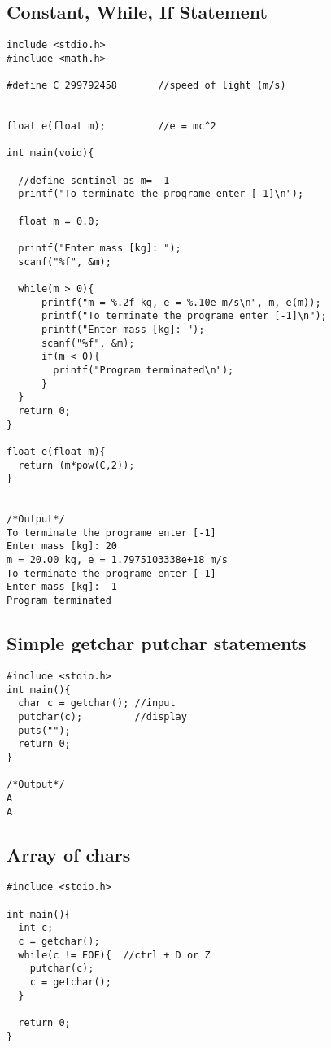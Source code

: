 \documentclass[10pt, a4paper, twocolumn]{article} %
\begin{document}
\newpage
\subsection{Constant, While, If Statement}

\begin{lstlisting}
include <stdio.h>
#include <math.h>

#define C 299792458       //speed of light (m/s)


float e(float m);         //e = mc^2

int main(void){

  //define sentinel as m= -1
  printf("To terminate the programe enter [-1]\n");

  float m = 0.0;

  printf("Enter mass [kg]: ");
  scanf("%f", &m);

  while(m > 0){
      printf("m = %.2f kg, e = %.10e m/s\n", m, e(m));
      printf("To terminate the programe enter [-1]\n");
      printf("Enter mass [kg]: ");
      scanf("%f", &m);
      if(m < 0){
        printf("Program terminated\n");
      }
  }
  return 0;
}

float e(float m){
  return (m*pow(C,2));
}


/*Output*/
To terminate the programe enter [-1]
Enter mass [kg]: 20
m = 20.00 kg, e = 1.7975103338e+18 m/s
To terminate the programe enter [-1]
Enter mass [kg]: -1
Program terminated
\end{lstlisting}

\subsection{Simple getchar putchar statements}

\begin{lstlisting}
#include <stdio.h>
int main(){
  char c = getchar(); //input
  putchar(c);         //display
  puts("");
  return 0;
}

/*Output*/
A
A
\end{lstlisting}

\subsection{Array of chars}

\begin{lstlisting}
#include <stdio.h>

int main(){
  int c;
  c = getchar();
  while(c != EOF){  //ctrl + D or Z
    putchar(c);
    c = getchar();
  }

  return 0;
}
\end{lstlisting}
\end{document}
